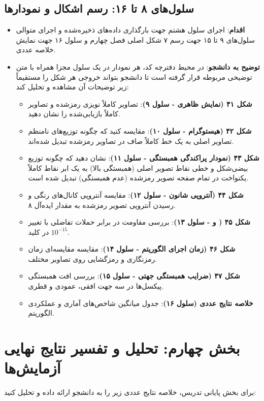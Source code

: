 \section{سلول‌های ۸ تا ۱۶: رسم اشکال و نمودارها}
\begin{itemize}
    \item \textbf{اقدام}: اجرای سلول هشتم جهت بارگذاری داده‌های ذخیره‌شده و اجرای متوالی سلول‌های ۹ تا ۱۵ جهت رسم ۷ شکل اصلی فصل چهارم و سلول ۱۶ جهت نمایش خلاصه عددی.
    \item \textbf{توضیح به دانشجو}: در محیط دفترچه کد، هر نمودار در یک سلول مجزا همراه با متن توضیحی مربوطه قرار گرفته است تا دانشجو بتواند خروجی هر شکل را مستقیماً زیر توضیحات آن مشاهده و تحلیل کند:
    \begin{itemize}
        \item \textbf{شکل ۴\lr{-}۱ (نمایش ظاهری - سلول ۹)}: تصاویر کاملاً نویزی رمزشده و تصاویر کاملاً بازیابی‌شده را نشان دهید.
        \item \textbf{شکل ۴\lr{-}۲ (هیستوگرام - سلول ۱۰)}: مقایسه کنید که چگونه توزیع‌های نامنظم تصاویر اصلی به یک خط کاملاً صاف در تصاویر رمزشده تبدیل شده‌اند.
        \item \textbf{شکل ۴\lr{-}۳ (نمودار پراکندگی همبستگی - سلول ۱۱)}: نشان دهید که چگونه توزیع بیضی‌شکل و خطی نقاط تصویر اصلی (همبستگی بالا) به یک ابر نقاط کاملاً یکنواخت در تمام صفحه تصویر رمزشده (عدم همبستگی) تبدیل شده است.
        \item \textbf{شکل ۴\lr{-}۴ (آنتروپی شانون - سلول ۱۲)}: مقایسه آنتروپی کانال‌های رنگی و رسیدن آنتروپی تصویر رمزشده به مقدار ایده‌آل ۸.
        \item \textbf{شکل ۴\lr{-}۵ ( و  - سلول ۱۳)}: بررسی مقاومت در برابر حملات تفاضلی با تغییر $10^{-15}$ در کلید.
        \item \textbf{شکل ۴\lr{-}۶ (زمان اجرای الگوریتم - سلول ۱۴)}: مقایسه مقایسه‌ای زمان رمزنگاری و رمزگشایی روی تصاویر مختلف.
        \item \textbf{شکل ۴\lr{-}۷ (ضرایب همبستگی جهتی - سلول ۱۵)}: بررسی افت همبستگی پیکسل‌ها در سه جهت افقی، عمودی و قطری.
        \item \textbf{خلاصه نتایج عددی (سلول ۱۶)}: جدول میانگین شاخص‌های آماری و عملکردی الگوریتم.
    \end{itemize}
\end{itemize}

\chapter{بخش چهارم: تحلیل و تفسیر نتایج نهایی آزمایش‌ها}
برای بخش پایانی تدریس، خلاصه نتایج عددی زیر را به دانشجو ارائه داده و تحلیل کنید:


